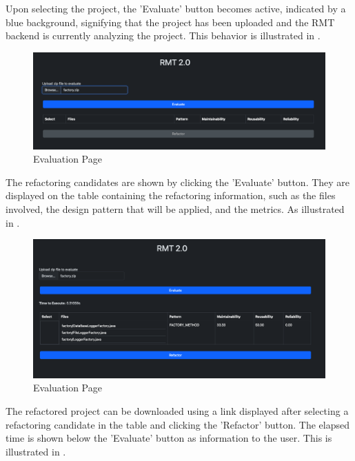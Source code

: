Upon selecting the project, the 'Evaluate' button becomes active, indicated by a blue background, signifying that the project has been uploaded and the RMT backend is currently analyzing the project. This behavior is illustrated in .

\begin{figure}[ht!]
\SetCaptionWidth{\textwidth}
\caption{Evaluation Page}
\label{fig-factory-selected}
\includegraphics[width =\textwidth]{Chapter-5/Figures/rmt-factory-client-selected.png}
\end{figure}
\FloatBarrier

The refactoring candidates are shown by clicking the 'Evaluate' button. They are displayed on the table containing the refactoring information, such as the files involved, the design pattern that will be applied, and the metrics. As illustrated in .

\begin{figure}[ht!]
\SetCaptionWidth{\textwidth}
\caption{Evaluation Page}
\label{fig-factory-evaluated}
\includegraphics[width =\textwidth]{Chapter-5/Figures/rmt-factory-evaluated.png}
\end{figure}
\FloatBarrier

The refactored project can be downloaded using a link displayed after selecting a refactoring candidate in the table and clicking the 'Refactor' button. The elapsed time is shown below the 'Evaluate' button as information to the user. This is illustrated in .

